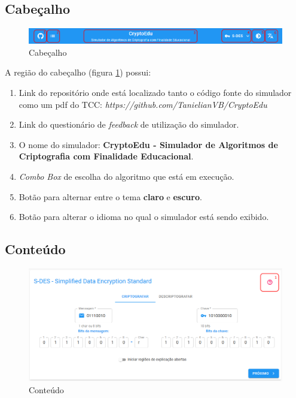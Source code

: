 \subsection{Cabeçalho}

\begin{figure}[H]
    \centering
    \caption{Cabeçalho}
    \label{fig:uicabecalho}
    \includegraphics[width=1\linewidth]{UI/UIHeader.png}
\end{figure}

A região do cabeçalho (figura \ref{fig:uicabecalho}) possui:
\begin{enumerate}
    \item Link do repositório onde está localizado tanto o código fonte do simulador como um pdf do TCC: \textit{https://github.com/TanielianVB/CryptoEdu}
    \item Link do questionário de \textit{feedback} de utilização do simulador.
    \item O nome do simulador: \textbf{CryptoEdu - Simulador de Algoritmos de Criptografia com Finalidade Educacional}.
    \item \textit{Combo Box} de escolha do algoritmo que está em execução.
    \item Botão para alternar entre o tema \textbf{claro} e \textbf{escuro}.
    \item Botão para alterar o idioma no qual o simulador está sendo exibido.
\end{enumerate}

\subsection{Conteúdo}

\begin{figure}[H]
    \centering
    \caption{Conteúdo}
    \label{fig:uimain}
    \includegraphics[width=1\linewidth]{UI/UIMain.png}
\end{figure}

